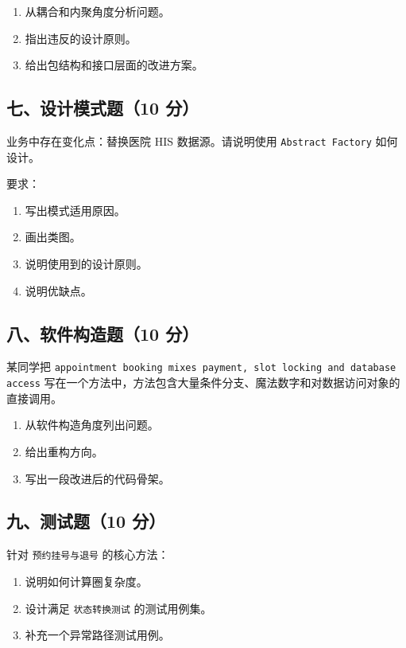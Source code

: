 \documentclass[UTF8,zihao=-4]{ctexart}
\begin{document}
\begin{enumerate}
\item 从耦合和内聚角度分析问题。
\item 指出违反的设计原则。
\item 给出包结构和接口层面的改进方案。
\end{enumerate}


\subsection{七、设计模式题（10 分）}


业务中存在变化点：替换医院 HIS 数据源。请说明使用 \texttt{Abstract Factory} 如何设计。


要求：


\begin{enumerate}
\item 写出模式适用原因。
\item 画出类图。
\item 说明使用到的设计原则。
\item 说明优缺点。
\end{enumerate}


\subsection{八、软件构造题（10 分）}


某同学把 \texttt{appointment booking mixes payment, slot locking and database access} 写在一个方法中，方法包含大量条件分支、魔法数字和对数据访问对象的直接调用。


\begin{enumerate}
\item 从软件构造角度列出问题。
\item 给出重构方向。
\item 写出一段改进后的代码骨架。
\end{enumerate}


\subsection{九、测试题（10 分）}


针对 \texttt{预约挂号与退号} 的核心方法：


\begin{enumerate}
\item 说明如何计算圈复杂度。
\item 设计满足 \texttt{状态转换测试} 的测试用例集。
\item 补充一个异常路径测试用例。
\end{enumerate}
\end{document}
